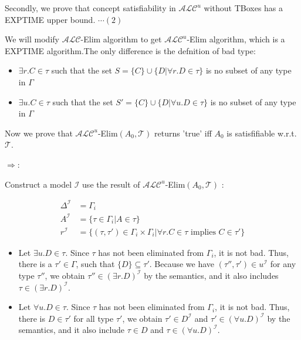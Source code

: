 \documentclass[12pt]{article}
\begin{document}
    Secondly, we prove that concept satisfiability in $\mathcal{ALC}^{u}$ without TBoxes has a EXPTIME upper bound. $\cdots (2)$\par
    We will modify $\mathcal{ALC}$-Elim algorithm to get $\mathcal{ALC}^{u}$-Elim algorithm, which is a EXPTIME algorithm.The only difference is the defnition of bad type:\par
    \begin{itemize}
        \item $\exists r.C \in \tau$  such that the set $S = \{C\} \cup \{ D| \forall r.D \in \tau \}$ is no subset of any type in $\Gamma$
        \item $\exists u.C \in \tau$ such that the set $S' = \{C\} \cup \{ D| \forall u.D \in \tau \}$ is no subset of any type in $\Gamma$
    \end{itemize} \par
    Now we prove that $\mathcal{ALC}^{u}$-Elim$(A_0, \mathcal{T} )$ returns 'true' iff $A_0$ is satisfifiable w.r.t. $\mathcal{T}$.\par
    $\Longrightarrow:$ \par
    Construct a model $\mathcal{I}$ use the result of $\mathcal{ALC}^{u}$-Elim$(A_0, \mathcal{T} )$ :\par
    $$
    \begin{aligned}\Delta^{\mathcal{I}} &= \Gamma_i\\
    A^{\mathcal{I}} &= \{{ \tau \in \Gamma_i | A \in \tau \}}\\
    r^{\mathcal{I}} &= \{{ (\tau, \tau') \in \Gamma_i \times \Gamma_i | \forall r.C \in \tau \text{ implies } C \in \tau' }\}\end{aligned}
    $$
    \begin{itemize}
        \item Let $\exists u.D \in \tau$. Since $\tau$ has not been eliminated from $\Gamma_i$, it is not bad. Thus, there is a $\tau' \in \Gamma$, such that $\{ D \} \subseteq \tau'$. Because we have $(\tau'', \tau') \in u^{\mathcal{I}}$ for any type $\tau''$, we obtain $\tau'' \in (\exists r.D)^{\mathcal{I}}$ by the semantics, and it also includes $\tau \in (\exists r.D)^{\mathcal{I}}$.
        \item Let $\forall u.D \in \tau$. Since $\tau$ has not been eliminated from $\Gamma_i$, it is not bad. Thus, there is $D \in \tau'$ for all type $\tau'$, we obtain $\tau' \in D^{\mathcal{I}}$ and $\tau' \in (\forall u.D)^{\mathcal{I}}$ by the semantics, and it also include $\tau \in D$ and $\tau \in (\forall u.D)^{\mathcal{I}}$.
    \end{itemize} \par
\end{document}
